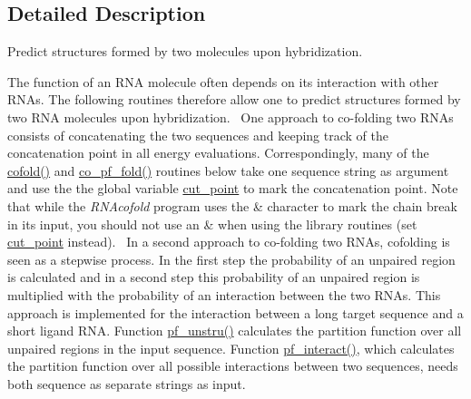 \subsection{Detailed Description}
Predict structures formed by two molecules upon hybridization. 

The function of an R\+NA molecule often depends on its interaction with other R\+N\+As. The following routines therefore allow one to predict structures formed by two R\+NA molecules upon hybridization.~\newline
One approach to co-\/folding two R\+N\+As consists of concatenating the two sequences and keeping track of the concatenation point in all energy evaluations. Correspondingly, many of the \hyperlink{group__mfe__cofold_gabc8517f22cfe70595ee81fc837910d52}{cofold()} and \hyperlink{part__func__co_8h_ae5c1e7331718669bdae7a86de2be6184}{co\+\_\+pf\+\_\+fold()} routines below take one sequence string as argument and use the the global variable \hyperlink{fold__vars_8h_ab9b2c3a37a5516614c06d0ab54b97cda}{cut\+\_\+point} to mark the concatenation point. Note that while the {\itshape R\+N\+Acofold} program uses the \textquotesingle{}\&\textquotesingle{} character to mark the chain break in its input, you should not use an \textquotesingle{}\&\textquotesingle{} when using the library routines (set \hyperlink{fold__vars_8h_ab9b2c3a37a5516614c06d0ab54b97cda}{cut\+\_\+point} instead).~\newline
In a second approach to co-\/folding two R\+N\+As, cofolding is seen as a stepwise process. In the first step the probability of an unpaired region is calculated and in a second step this probability of an unpaired region is multiplied with the probability of an interaction between the two R\+N\+As. This approach is implemented for the interaction between a long target sequence and a short ligand R\+NA. Function \hyperlink{group__up__cofold_ga5b4ee40e190d2f633cd01cf0d2fe93cf}{pf\+\_\+unstru()} calculates the partition function over all unpaired regions in the input sequence. Function \hyperlink{group__up__cofold_ga1aa0aa02bc3a724f87360c03097afd00}{pf\+\_\+interact()}, which calculates the partition function over all possible interactions between two sequences, needs both sequence as separate strings as input. 